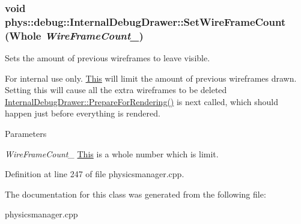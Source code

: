 \hypertarget{classphys_1_1debug_1_1InternalDebugDrawer_a76922fda7bb3b59d301e50d67e4f3c72}{
\subsubsection[{SetWireFrameCount}]{\setlength{\rightskip}{0pt plus 5cm}void phys::debug::InternalDebugDrawer::SetWireFrameCount ({\bf Whole} {\em WireFrameCount\_\-})}}
\label{db/d27/classphys_1_1debug_1_1InternalDebugDrawer_a76922fda7bb3b59d301e50d67e4f3c72}


Sets the amount of previous wireframes to leave visible. 

\begin{DoxyInternal}{For internal use only.}
\hyperlink{structThis}{This} will limit the amount of previous wireframes drawn. Setting this will cause all the extra wireframes to be deleted \hyperlink{classphys_1_1debug_1_1InternalDebugDrawer_a1002293d223ca20e5bccc3c3412ce262}{InternalDebugDrawer::PrepareForRendering()} is next called, which should happen just before everything is rendered. 
\begin{DoxyParams}{Parameters}
\item[{\em WireFrameCount\_\-}]\hyperlink{structThis}{This} is a whole number which is limit. \end{DoxyParams}
\end{DoxyInternal}


Definition at line 247 of file physicsmanager.cpp.



The documentation for this class was generated from the following file:\begin{DoxyCompactItemize}
\item 
physicsmanager.cpp\end{DoxyCompactItemize}
